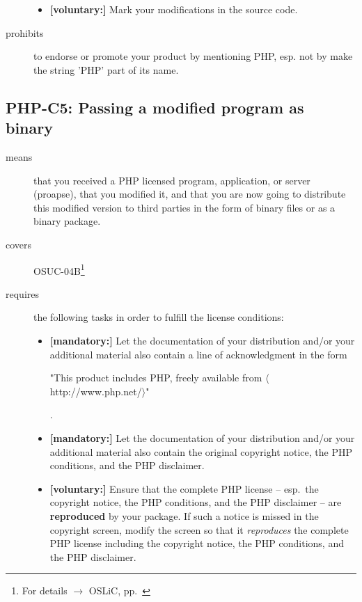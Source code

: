 \begin{description}
\begin{itemize}
  \item \textbf{[voluntary:]} Mark your modifications in the source code.
  
  
\end{itemize}

\item[prohibits] to endorse or promote your product by mentioning PHP, esp. not
by make the string 'PHP' part of its name.

\end{description}

\subsection{PHP-C5: Passing a modified program as binary}
\label{OSUC-04B-PHP}

\begin{description}
\item[means] that you received a PHP licensed program, application, or
  server (proapse), that you modified it, and that you are now going to
  distribute this modified version to third parties in the form of binary files or as a
  binary package.

\item[covers] OSUC-04B\footnote{For details $\rightarrow$ OSLiC, pp.\
\pageref{OSUC-04B-DEF}}
\item[requires] the following tasks in order to fulfill the license conditions:
\begin{itemize}
  
  \item \textbf{[mandatory:]} Let the documentation of your distribution and/or
  your additional material also contain a line of acknowledgment in the form
  \begin{footnotesize}"This product includes PHP, freely available from
  $\langle$http://www.php.net/$\rangle$"\end{footnotesize}.
    
  \item \textbf{[mandatory:]} Let the documentation of your distribution and/or
  your additional material also contain the original copyright notice, the PHP
  conditions, and the PHP disclaimer.

  \item \textbf{[voluntary:]} Ensure that the complete PHP license -- esp.\ the
  copyright notice, the PHP conditions, and the PHP disclaimer -- are
  \textbf{reproduced} by your package. If such a notice is missed in the
  copyright screen, modify the screen so  that it \emph{reproduces} the complete
  PHP license including the copyright notice, the PHP conditions, and the PHP
  disclaimer.
  

\end{itemize}
\end{description}
